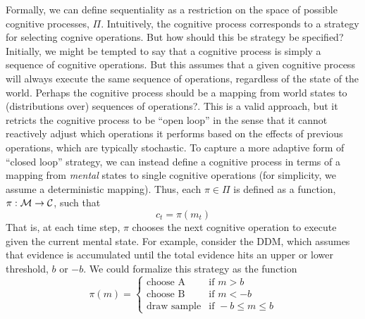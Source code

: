 Formally, we can define sequentiality as a restriction on the space of possible cognitive processes, $\Pi$. Intuitively, the cognitive process corresponds to a strategy for selecting cognive operations. But how should this be strategy be specified? Initially, we might be tempted to say that a cognitive process is simply a sequence of cognitive operations. But this assumes that a given cognitive process will always execute the same sequence of operations, regardless of the state of the world. Perhaps the cognitive process should be a mapping from world states to (distributions over) sequences of operations?. This is a valid approach, but it retricts the cognitive process to be ``open loop'' in the sense that it cannot reactively adjust which operations it performs based on the effects of previous operations, which are typically stochastic. To capture a more adaptive form of ``closed loop'' strategy, we can instead define a cognitive process in terms of a mapping from \emph{mental} states to single cognitive operations (for simplicity, we assume a deterministic mapping). Thus, each $π \in \Pi$ is defined as a function, $\pi: \mathcal{M} \rightarrow \mathcal{C}$, such that
\begin{equation}\label{eq:intro-sequential}
   c_t = \pi(m_t)
\end{equation}
That is, at each time step, $\pi$ chooses the next cognitive operation to execute given the current mental state. For example, consider the DDM, which assumes that evidence is accumulated until the total evidence hits an upper or lower threshold, $b$ or $-b$. We could formalize this strategy as the function
\begin{equation}
  \pi(m) = \begin{cases}
    \text{choose A} &\text{if } m > b  \\
    \text{choose B} &\text{if } m < -b  \\
    \text{draw sample} &\text{if } -b ≤ m ≤ b
  \end{cases}
\end{equation}

